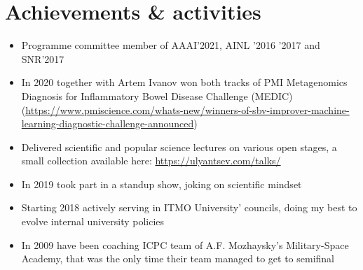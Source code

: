 \documentclass[11pt,a4paper,sans]{moderncv}        %
\begin{document}
\section{Achievements \& activities}

\begin{itemize}
  \item Programme committee member of AAAI'2021, AINL '2016 '2017 and SNR'2017  
  \item In 2020 together with Artem Ivanov won both tracks of PMI Metagenomics Diagnosis for Inflammatory Bowel Disease Challenge (MEDIC) 
        (\url{https://www.pmiscience.com/whats-new/winners-of-sbv-improver-machine-learning-diagnostic-challenge-announced})
  \item Delivered scientific and popular science lectures on various open stages, a small collection available here:
        \url{https://ulyantsev.com/talks/}
  \item In 2019 took part in a standup show, joking on scientific mindset
  \item Starting 2018 actively serving in ITMO University' councils, doing my best to evolve internal university policies
  \item In 2009 have been coaching ICPC team of A.F. Mozhaysky's Military-Space Academy, 
        that was the only time their team managed to get to semifinal
\end{itemize}








\end{document}
